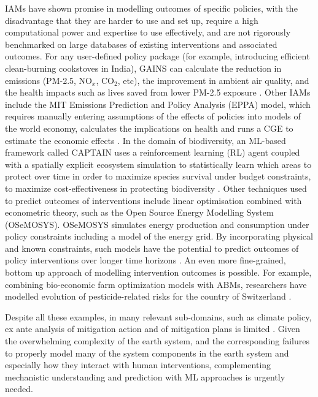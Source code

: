 \documentclass[12pt,a4paper]{article}
\begin{document}
IAMs have shown promise in modelling outcomes of specific policies, with the disadvantage that they are harder to use and set up, require a high computational power and expertise to use effectively, and are not rigorously benchmarked on large databases of existing interventions and associated outcomes. For any user-defined policy package (for example, introducing efficient clean-burning cookstoves in India), GAINS can calculate the reduction in emissions (PM-2.5, NO$_x$, CO$_2$, etc), the improvement in ambient air quality, and the health impacts such as lives saved from lower PM-2.5 exposure . Other IAMs include the MIT Emissions Prediction and Policy Analysis (EPPA) model, which requires manually entering assumptions of the effects of policies into models of the world economy, calculates the implications on health and runs a CGE to estimate the economic effects . 
In the domain of biodiversity, an ML-based framework called CAPTAIN uses a reinforcement learning (RL) agent coupled with a spatially explicit ecosystem simulation to statistically learn which areas to protect over time in order to maximize species survival under budget constraints, to maximize cost-effectiveness in protecting biodiversity . 
Other techniques used to predict outcomes of interventions include linear optimisation combined with econometric theory, such as the Open Source Energy Modelling System (OSeMOSYS). OSeMOSYS simulates energy production and consumption under policy constraints including a model of the energy grid. By incorporating physical and known constraints, such models have the potential to predict outcomes of policy interventions over longer time horizons . An even more fine-grained, bottom up approach of modelling intervention outcomes is possible. For example, combining bio-economic farm optimization models with ABMs, researchers have modelled evolution of pesticide-related risks for the country of Switzerland .

Despite all these examples, in many relevant sub-domains, such as climate policy, ex ante analysis of mitigation action and of mitigation plans is limited . Given the overwhelming complexity of the earth system, and the corresponding failures to properly model many of the system components in the earth system and especially how they interact with human interventions, complementing mechanistic understanding and prediction with ML approaches is urgently needed. 
\end{document}

